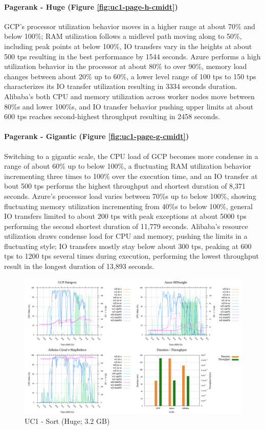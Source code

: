 \documentclass[review]{elsarticle}
\begin{document}
\paragraph{Pagerank - Huge (Figure \ref{fig:uc1-page-h-cmidt})}GCP's processor utilization behavior moves in a higher range at about 70\% and below 100\%; RAM utilization follows a midlevel path moving along to 50\%, including peak points at below 100\%, IO transfers vary in the heights at about 500 tps resulting in the best performance by 1544 seconds. Azure performs a high utilization behavior in the processor at about 80\% to over 90\%, memory load changes between about 20\% up to 60\%, a lower level range of 100 tps to 150 tps characterizes its IO transfer utilization resulting in 3334 seconds duration. Alibaba's both CPU and memory utilization across worker nodes move between 80\%s and lower 100\%s, and IO transfer behavior pushing upper limits at about 600 tps reaches second-highest throughput resulting in 2458 seconds.

\paragraph{Pagerank - Gigantic (Figure \ref{fig:uc1-page-g-cmidt})}Switching to a gigantic scale, the CPU load of GCP becomes more condense in a range of about 60\% up to below 100\%, a fluctuating RAM utilization behavior incrementing three times to 100\% over the execution time, and an IO transfer at bout 500 tps performs the highest throughput and shortest duration of 8,371 seconds. Azure's processor load varies between 70\%s up to below 100\%, showing fluctuating memory utilization incrementing from 40\%s to below 100\%, general IO transfers limited to about 200 tps with peak exceptions at about 5000 tps performing the second shortest duration of 11,779 seconds. Alibaba's resource utilization draws condense load for CPU and memory, pushing the limits in a fluctuating style; IO transfers mostly stay below about 300 tps, peaking at 600 tps to 1200 tps several times during execution, performing the lowest throughput result in the longest duration of 13,893 seconds.

\begin{figure}[p]
	\caption{UC1 - Sort (Huge; 3.2 GB)}
	\label{fig:uc1-srt-h-cmidt}
	\includegraphics[width=\textwidth]{uc1-srt-h-cmidt}
	\centering
\end{figure}
\end{document}
